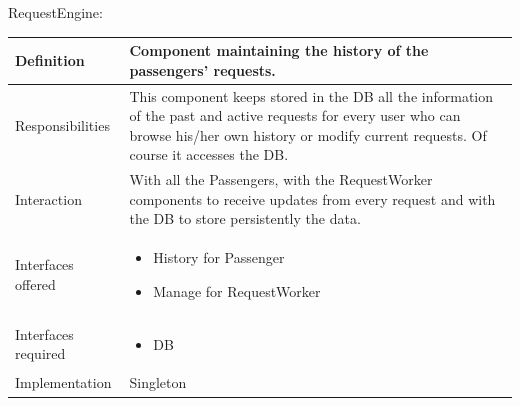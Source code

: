 \documentclass[a4paper,11pt]{report} %
\begin{document}
	\pagebreak
	\vspace*{-0.35cm}
	\centerline{RequestEngine:}
	\begin{center}
		\begin{tabular}{| l | p{9cm} |}\hline
			Definition & Component maintaining the history of the passengers' requests.\\\hline
			Responsibilities & This component keeps stored in the DB all the information of the past and active requests for every user who can browse his/her own history or modify current requests. Of course it accesses the DB.\\\hline
			Interaction & With all the Passengers, with the RequestWorker components to receive updates from every request and with the DB to store persistently the data.\\\hline
			Interfaces offered & \begin{itemize}
				\item History for Passenger
				\item Manage for RequestWorker
			\end{itemize}\\\hline
			Interfaces required & \begin{itemize}
				\item DB
			\end{itemize}\\\hline
			Implementation & Singleton\\\hline
		\end{tabular}
	\end{center}		
	
\end{document}
